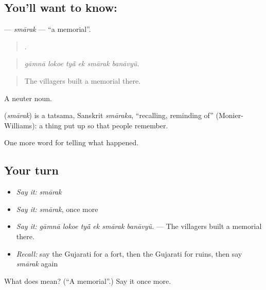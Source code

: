 \subsection*{You'll want to know: }
\textbf{} — \emph{smārak} — \textquotedblleft{}a memorial\textquotedblright{}.

\begin{quote}
     .
\end{quote}

\begin{quote}
\emph{gāmnā lokoe tyā̃ ek smārak banāvyũ.}
\end{quote}

\begin{quote}
The villagers built a memorial there.
\end{quote}

A neuter noun.

\begin{cousinweb}
\textbf{} (\emph{smārak}) is a tatsama, Sanskrit \emph{smāraka}, \textquotedblleft{}recalling, reminding of\textquotedblright{} (Monier-Williams): a thing put up so that people remember.
\end{cousinweb}

\begin{grammarlens}[title={What you've built}]
One more word for telling what happened.
\end{grammarlens}

\subsection*{Your turn}
\begin{itemize}
\raggedright
  \item \emph{Say it:} \emph{smārak}
  \item \emph{Say it:} \emph{smārak}, once more
  \item \emph{Say it:} \emph{gāmnā lokoe tyā̃ ek smārak banāvyũ.} — The villagers built a memorial there.
  \item \emph{Recall:} say the Gujarati for a fort, then the Gujarati for ruins, then say \emph{smārak} again
\end{itemize}

\begin{tcolorbox}[breakable,colback=teal!4,colframe=teal!35!black,title={Before you move on}]
What does  mean? (\textquotedblleft{}A memorial\textquotedblright{}.) Say it once more.
\end{tcolorbox}
